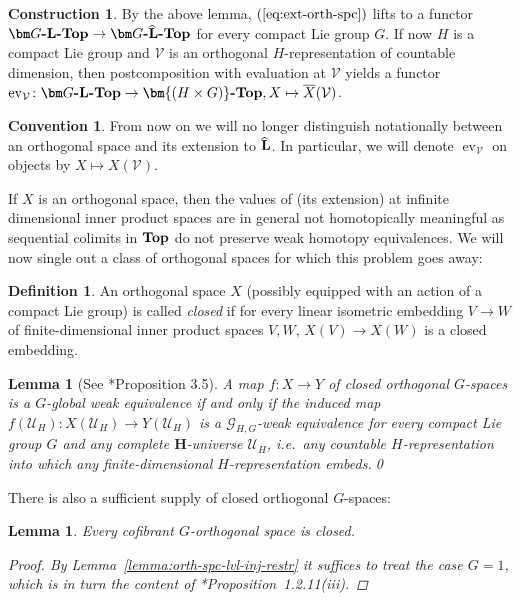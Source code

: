 \documentclass[reqno]{memo-l}
\theoremstyle{mythm}
\newtheorem{lemma}[thm]{Lemma}
\theoremstyle{definition}
\newtheorem{constr}[thm]{Construction}
\newtheorem{convention}[thm]{Convention}
\newtheorem{definition}[thm]{Definition}
\numberwithin{equation}{section}
\newcommand{\Uu}{{\mathcal{U}}}
\newcommand{\Vv}{{\mathcal{V}}}
\newcommand{\Lhat}{{\widehat{{\smash{\cat{L}}\vphantom{t}}\kern-1.75pt}\kern1.75pt}}
\DeclareMathOperator{\ev}{ev}
\newcommand{\cat}[1]{\textbf{\textup{#1}}}
\begin{document}
\begin{constr}
    By the above lemma, $(\ref{eq:ext-orth-spc})$ lifts to a functor $\cat{$\bm G$-$\cat{L}$-Top}\to\cat{$\bm G$-$\Lhat$-Top}$ for every compact Lie group $G$. If now $H$ is a compact Lie group and $\Vv$ is an orthogonal $H$-representation of countable dimension, then postcomposition with evaluation at $\Vv$ yields a functor $\ev_\Vv\colon\cat{$\bm G$-$\cat{L}$-Top}\to\cat{$\bm{(H\times G)}$-Top}, X\mapsto\overline{X}(\Vv)$.
\end{constr}

\begin{convention}
    From now on we will no longer distinguish notationally between an orthogonal space and its extension to $\Lhat$. In particular, we will denote $\ev_\Vv$ on objects by $X\mapsto X(\Vv)$.
\end{convention}

If $X$ is an orthogonal space, then the values of (its extension) at infinite dimensional inner product spaces are in general not homotopically meaningful as sequential colimits in $\cat{Top}$ do not preserve weak homotopy equivalences. We will now single out a class of orthogonal spaces for which this problem goes away:

\begin{definition}\label{def:closed-orth-spc}
    An orthogonal space $X$ (possibly equipped with an action of a compact Lie group) is called \emph{closed} if for every linear isometric embedding $V\to W$ of finite-dimensional inner product spaces $V,W$, $X(V)\to X(W)$ is a closed embedding.
\end{definition}

\begin{lemma}[See \cite{barrero2021}*{Proposition 3.5}]\label{lemma:we-between-closed} 
    A map $f\colon X\to Y$ of \emph{closed} orthogonal $G$-spaces is a $G$-global weak equivalence if and only if the induced map $f(\Uu_H)\colon X(\Uu_H)\to Y(\Uu_H)$ is a $\mathcal G_{H,G}$-weak equivalence for every compact Lie group $G$ and any \emph{complete $\bm H$-universe} $\Uu_H$, i.e.\ any countable $H$-representation into which any finite-dimensional $H$-representation embeds.\qed
\end{lemma}

There is also a sufficient supply of closed orthogonal $G$-spaces:

\begin{lemma}\label{lemma:cofibrant-closed}
    Every cofibrant $G$-orthogonal space is closed.
    \begin{proof}
        By Lemma~\ref{lemma:orth-spc-lvl-inj-restr} it suffices to treat the case $G=1$, which is in turn the content of \cite{schwede2018global}*{Proposition~1.2.11(iii)}.
    \end{proof}
\end{lemma}
\end{document}
